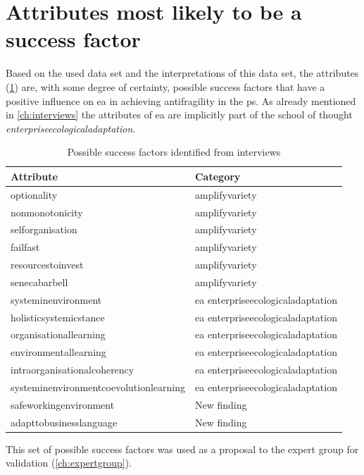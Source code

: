 \section{Attributes most likely to be a success factor}
\label{sec:attributeslikelysf}
Based on the used data set and the interpretations of this data set, the attributes (\cref{tab:interviewpossiblesf}) are, with some degree of certainty, possible success factors that have a positive influence on \acrshort{ea} in achieving \gls{antifragility} in the \gls{ps}. As already mentioned in \cref{ch:interviews} the attributes of \acrshort{ea} are implicitly part of the school of thought \textit{\gls{enterpriseecologicaladaptation}}.
\begin{table}[H]
	\begin{center}
			\begin{tabular}{@{}ll@{}}
				\toprule%
				\textbf{Attribute} & \textbf{Category}  \\%
				\midrule%
				\Gls{optionality} & \Gls{amplifyvariety} \\%
				\Gls{nonmonotonicity} & \Gls{amplifyvariety} \\%
				\Gls{selforganisation} & \Gls{amplifyvariety} \\%
				\Gls{failfast} & \Gls{amplifyvariety} \\%
				\Gls{resourcestoinvest} & \Gls{amplifyvariety} \\%
				\Gls{senecabarbell} & \Gls{amplifyvariety} \\%
				\Gls{systeminenvironment} & \acrshort{ea} \Gls{enterpriseecologicaladaptation} \\%
				\Gls{holisticsystemicstance} & \acrshort{ea} \Gls{enterpriseecologicaladaptation} \\%
				\Gls{organisationallearning} & \acrshort{ea} \Gls{enterpriseecologicaladaptation} \\%
				\Gls{environmentallearning} & \acrshort{ea} \Gls{enterpriseecologicaladaptation} \\%
				\Gls{intraorganisationalcoherency} & \acrshort{ea} \Gls{enterpriseecologicaladaptation} \\%
				\Gls{systeminenvironmentcoevolutionlearning} & \acrshort{ea} \Gls{enterpriseecologicaladaptation} \\%
				\Gls{safeworkingenvironment} & New finding \\%
				\Gls{adapttobusinesslanguage} & New finding \\%
				\bottomrule%
			\end{tabular}
		\caption{Possible success factors identified from interviews}
		\label{tab:interviewpossiblesf}
	\end{center}
\end{table}
This set of possible success factors was used as a proposal to the expert group for validation (\cref{ch:expertgroup}).